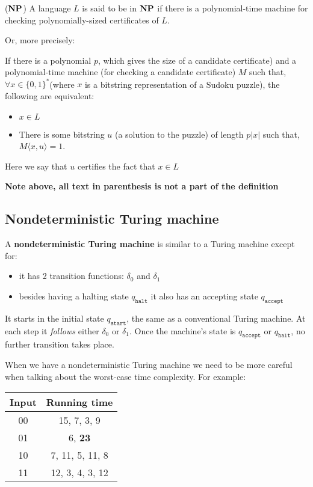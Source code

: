 \documentclass{article}
\begin{document}
  \begin{definition}($\bf{NP}$)
    A language $L$ is said to be in $\bf{NP}$ if there is a polynomial-time machine for checking polynomially-sized certificates of $L$.

    Or, more precisely:

    If there is a polynomial $p$, which gives the size of a candidate certificate) and a polynomial-time machine (for checking a candidate certificate) $M$ such that, $\forall x \in \{ 0,1 \}^{*} $(where $x$ is a bitstring representation of a Sudoku puzzle), the following are equivalent:

    \begin{itemize}
      \item $x\in L$
      \item There is some bitstring $u$ (a solution to the puzzle) of length $p|x|$ such that, $M \langle x,u \rangle = 1$.
    \end{itemize}

    Here we say that $u$ certifies the fact that $x \in L$
  \end{definition}

  \textbf{Note above, all text in parenthesis is not a part of the definition}

  \subsection{Nondeterministic Turing machine}


  A \textbf{nondeterministic Turing machine} is similar to a Turing machine except for:
  \begin{itemize}
    \item it has 2 transition functions: $\delta_{0}$ and $\delta_{1}$
          \item besides having a halting state $q_{\texttt{halt} }$ it also has an accepting state $q_{\texttt{accept} }$
  \end{itemize}

  It starts in the initial state $q_{\texttt{start} }$, the same as a conventional Turing machine. At each step it \textit{follows} either $\delta_{0 }$ or $\delta_{1}$. Once the machine's state is $q_{\texttt{accept} }$ or $q_{\texttt{halt} }$, no further transition takes place.


  When we have a nondeterministic Turing machine we need to be more careful when talking about the worst-case time complexity.
  For example:


\begin{center}
 \begin{tabular}{|c|c|}
 \hline
 Input & Running time\\ [0.5ex]
 \hline\hline
 00 & 15, 7, 3, 9\\
 \hline
 01 & 6, \textbf{23}\\
 \hline
 10 & 7, 11, 5, 11, 8 \\
 \hline
 11 & 12, 3, 4, 3, 12\\
 \hline
\end{tabular}
\end{center}
\end{document}
